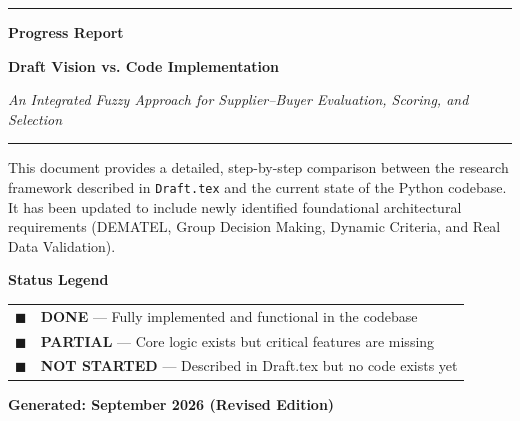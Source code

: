 \documentclass[11pt]{article}
\begin{document}
\hypersetup{pageanchor=false}

\begin{titlepage}
\setlength{\parskip}{0pt}
\thispagestyle{empty}
\centering

\vspace*{0.5cm}

{\color{ejustblue}\rule{0.78\textwidth}{1.6pt}\par}
\vspace{0.4cm}
{\huge\bfseries Progress Report\par}
\vspace{0.25cm}
{\LARGE\bfseries Draft Vision vs. Code Implementation\par}
\vspace{0.15cm}
{\large\itshape An Integrated Fuzzy Approach for Supplier--Buyer Evaluation, Scoring, and Selection\par}
\vspace{0.4cm}
{\color{ejustblue}\rule{0.78\textwidth}{1.6pt}\par}

\vspace{0.8cm}

{\large This document provides a detailed, step-by-step comparison between the research framework described in \texttt{Draft.tex} and the current state of the Python codebase. It has been updated to include newly identified foundational architectural requirements (DEMATEL, Group Decision Making, Dynamic Criteria, and Real Data Validation).\par}

\vspace{1.2cm}

\begin{minipage}{0.82\textwidth}
\centering
{\large\bfseries Status Legend\par}
\vspace{0.3cm}
\begin{tabular}{cl}
\textcolor{done}{$\blacksquare$} & \textbf{DONE} --- Fully implemented and functional in the codebase \\[4pt]
\textcolor{partial}{$\blacksquare$} & \textbf{PARTIAL} --- Core logic exists but critical features are missing \\[4pt]
\textcolor{notdone}{$\blacksquare$} & \textbf{NOT STARTED} --- Described in Draft.tex but no code exists yet \\
\end{tabular}
\end{minipage}

\vspace{1.5cm}

{\large\bfseries Generated: September 2026 (Revised Edition)\par}

\end{titlepage}
\end{document}
